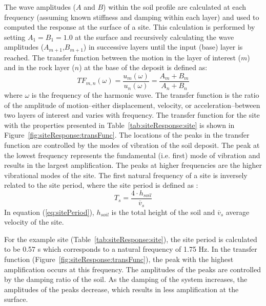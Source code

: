 \documentclass[12pt,oneside]{book}
\begin{document}
The wave amplitudes ($A$ and $B$) within the soil profile are calculated at each
frequency (assuming known stiffness and damping within each layer) and used to
computed the response at the surface of a site.  This calculation is performed
by setting $A_{1}=B_{1}=1.0$ at the surface and recursively calculating the wave
amplitudes ($A_{m+1}$,$B_{m+1}$) in successive layers until the input (base)
layer is reached.  The transfer function between the motion in the layer of
interest ($m$) and in the rock layer ($n$) at the base of the deposit is defined
as:
\begin{equation}
    TF_{m,n}(\omega) = \frac{u_m(\omega)}{u_n(\omega)}= \frac{A_m + B_m}{A_n + B_n}
    \label{eq:transFunc}
\end{equation}
where $\omega$ is the frequency of the harmonic wave.  The transfer function is
the ratio of the amplitude of motion--either displacement, velocity, or
acceleration--between two layers of interest and varies with frequency.  The
transfer function for the site with the properties presented in
Table~\ref{tab:siteResponse:site} is shown in
Figure~\ref{fig:siteResponse:transFunc}.  The locations of the peaks in the
transfer function are controlled by the modes of vibration of the soil deposit.
The peak at the lowest frequency represents the fundamental (i.e. first) mode of
vibration and results in the largest amplification.  The peaks at higher
frequencies are the higher vibrational modes of the site.  The first natural
frequency of a site is inversely related to the site period, where the site
period is defined as \citep{kramer:96}:
\begin{equation}
    T_s = \frac{4\cdot h_{soil}}{\overline{v}_s} %
    \label{eq:sitePeriod}
\end{equation}
In equation (\ref{eq:sitePeriod}), $h_{soil}$ is the total height of the soil
and $\overline{v}_s$ average velocity of the site.  

For the example site (Table~\ref{tab:siteResponse:site}), the site period is
calculated to be 0.57 s which corresponds to a natural frequency of 1.75 Hz.  In
the transfer function (Figure~\ref{fig:siteResponse:transFunc}), the peak with
the highest amplification occurs at this frequency.  The amplitudes of the peaks
are controlled by the damping ratio of the soil. As the damping of the system
increases, the amplitudes of the peaks decrease, which results in less
amplification at the surface.
\end{document}
